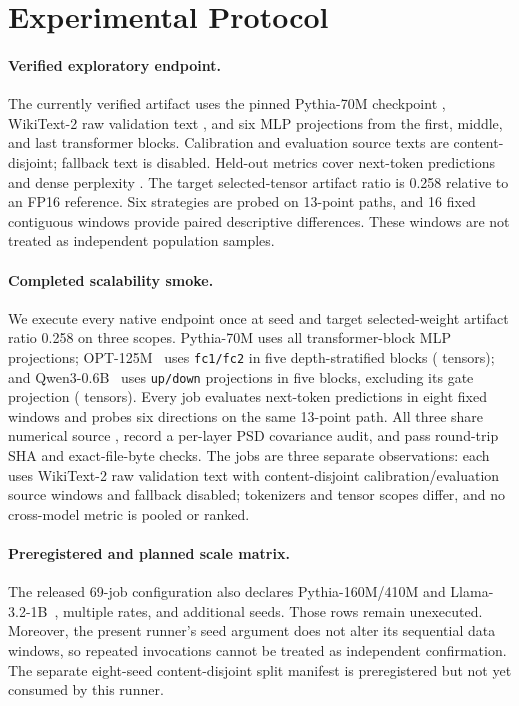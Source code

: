 \section{Experimental Protocol}
\label{sec:experiments}

\paragraph{Verified exploratory endpoint.}
The currently verified artifact uses the pinned Pythia-70M checkpoint
\citep{biderman2023pythia}, WikiText-2 raw validation text
\citep{merity2017wikitext}, and six MLP projections from the first,
middle, and last transformer blocks.  Calibration and evaluation source texts
are content-disjoint; fallback text is disabled.  Held-out metrics cover
\VerifiedEvalTokens{} next-token predictions and dense perplexity
\DensePPL{}.  The target selected-tensor artifact ratio is 0.258 relative to
an FP16 reference.  Six strategies are probed on 13-point paths, and 16 fixed
contiguous windows provide paired descriptive differences.  These windows are
not treated as independent population samples.

\paragraph{Completed scalability smoke.}
We execute every native endpoint once at seed \ScalePilotSeed{} and target
selected-weight artifact ratio 0.258 on three scopes.  Pythia-70M uses all
\ScalePilotPythiaSelectedTensors{} transformer-block MLP projections;
OPT-125M~\citep{zhang2022opt} uses \texttt{fc1/fc2} in five depth-stratified
blocks (\ScalePilotOPTSelectedTensors{} tensors); and
Qwen3-0.6B~\citep{yang2025qwen3} uses \texttt{up/down} projections
in five blocks, excluding its gate projection
(\ScalePilotQwenSelectedTensors{} tensors).  Every job evaluates
\ScalePilotEvalTokens{} next-token predictions in eight fixed windows and
probes six directions on the same 13-point path.  All three share numerical
source \ScalePilotNumericalSourceSHA{}, record a per-layer PSD covariance
audit, and pass round-trip SHA and exact-file-byte checks.  The jobs are three
separate observations: each uses WikiText-2 raw validation text with
content-disjoint calibration/evaluation source windows and fallback disabled;
tokenizers and tensor scopes differ, and no cross-model metric is pooled or
ranked.

\paragraph{Preregistered and planned scale matrix.}
The released 69-job configuration also declares Pythia-160M/410M and
Llama-3.2-1B~\citep{grattafiori2024llama3}, multiple rates, and additional
seeds.  Those rows remain unexecuted.  Moreover, the present runner's seed
argument does not alter its sequential data windows, so repeated invocations
cannot be treated as independent confirmation.  The separate eight-seed
content-disjoint split manifest is preregistered but not yet consumed by this
runner.


